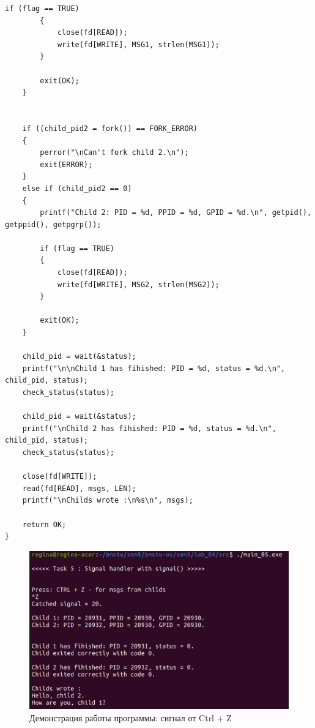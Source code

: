 \begin{center}
\begin{lstlisting}[label=lst:signal,caption=Системный вызов signal()]
        if (flag == TRUE)
        {
            close(fd[READ]);
            write(fd[WRITE], MSG1, strlen(MSG1));
        }

        exit(OK);
    }


    if ((child_pid2 = fork()) == FORK_ERROR)
    {
        perror("\nCan't fork child 2.\n");
        exit(ERROR);
    }
    else if (child_pid2 == 0)
    {
        printf("Child 2: PID = %d, PPID = %d, GPID = %d.\n", getpid(), getppid(), getpgrp());

        if (flag == TRUE)
        {
            close(fd[READ]);
            write(fd[WRITE], MSG2, strlen(MSG2));
        }

        exit(OK);
    }

    child_pid = wait(&status);
    printf("\n\nChild 1 has fihished: PID = %d, status = %d.\n", child_pid, status);
    check_status(status);

    child_pid = wait(&status);
    printf("\nChild 2 has fihished: PID = %d, status = %d.\n", child_pid, status);
    check_status(status);

    close(fd[WRITE]);
    read(fd[READ], msgs, LEN);
    printf("\nChilds wrote :\n%s\n", msgs);

    return OK;
}
\end{lstlisting}
\end{center}

\begin{figure}[H]
	\begin{center}
		\includegraphics[scale=0.3]{inc/ctrlz.png}
	\end{center}
	\captionsetup{justification=centering}
	\caption{Демонстрация работы программы: сигнал от Ctrl + Z}
	\label{img:ctrlz}
\end{figure}

